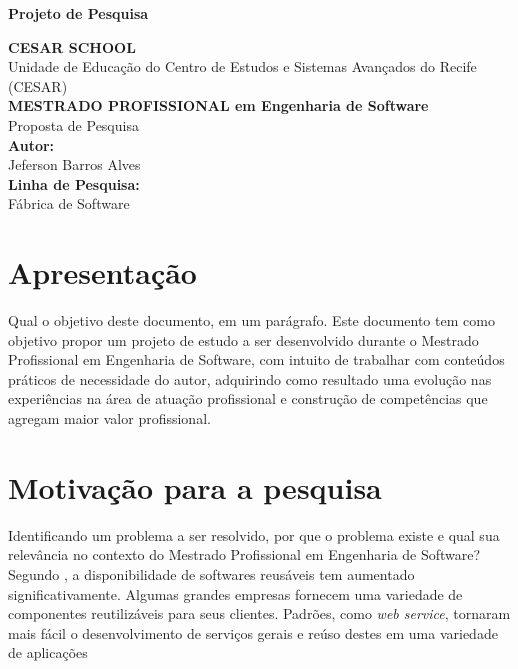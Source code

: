 \documentclass[10pt,a4paper]{article}
\begin{document}
\begin{titlepage}
\begin{center}{\bf \Large Projeto de Pesquisa}\\[3.5cm]
\end{center}
\begin{flushright}
{\bf CESAR SCHOOL}\\
{Unidade de Educação do Centro de Estudos e Sistemas Avançados do Recife}
{(CESAR)}\\[3.5cm]
{\bf \large MESTRADO PROFISSIONAL em Engenharia de Software}\\
{Proposta de Pesquisa}\\[2.5cm] 
{\bf Autor:}\\
{Jeferson Barros Alves}\\[0.8cm]
{\bf Linha de Pesquisa:}\\
{Fábrica de Software}\\[0.8cm]
\end{flushright}
\end{titlepage}
 
\tableofcontents

\newpage

\section{Apresentação}
Qual o objetivo deste documento, em um parágrafo.
Este documento tem como objetivo propor um projeto de estudo a ser desenvolvido durante o Mestrado Profissional em Engenharia de Software, com intuito de trabalhar com conteúdos práticos de necessidade do autor, adquirindo como resultado uma evolução nas experiências na área de atuação profissional e construção de competências que agregam maior valor profissional.

\section{Motivação para a pesquisa}
Identificando um problema a ser resolvido, \cite{Mazo2012} por que o problema existe e qual sua relevância
no contexto do Mestrado Profissional em Engenharia de Software?
Segundo \cite{Sommerville2011}, a disponibilidade de softwares reusáveis tem aumentado significativamente. Algumas grandes empresas fornecem uma variedade de componentes reutilizáveis para seus clientes. Padrões, como \textit{web service}, tornaram mais fácil o desenvolvimento de serviços gerais e reúso destes em uma variedade de aplicações
\end{document}
